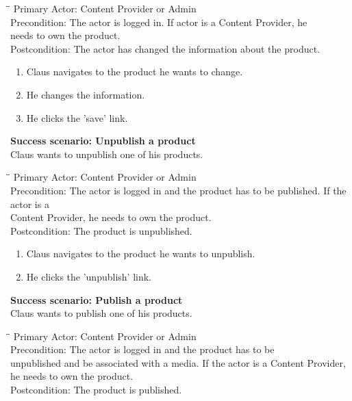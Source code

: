 \begin{tabbing}
\hspace{5mm}\=\hspace{26mm}\=\kill
\>Primary Actor:\> Content Provider or Admin\\
\>Precondition:\> The actor is logged in. If actor is a Content Provider, he\\ \hspace{85px} needs to own the product.\\
\>Postcondition:\> The actor has changed the information about the product.
\end{tabbing}
\begin{enumerate} \setlength{\itemsep}{-1mm}
	\item Claus navigates to the product he wants to change.
	\item He changes the information.
	\item He clicks the 'save' link.
\end{enumerate}
\vspace{3mm}
\textbf{Success scenario: Unpublish a product} \\
Claus wants to unpublish one of his products.
\begin{tabbing}
\hspace{5mm}\=\hspace{26mm}\=\kill
\>Primary Actor:\> Content Provider or Admin\\
\>Precondition:\> The actor is logged in and the product has to be published. If the actor is a\\ \hspace{85px} Content Provider, he needs to own the product.\\
\>Postcondition:\> The product is unpublished.
\end{tabbing}
\begin{enumerate} \setlength{\itemsep}{-1mm}
	\item Claus navigates to the product he wants to unpublish.
	\item He clicks the 'unpublish' link.
\end{enumerate}
\vspace{3mm}
\textbf{Success scenario: Publish a product} \\
Claus wants to publish one of his products.
\begin{tabbing}
\hspace{5mm}\=\hspace{26mm}\=\kill
\>Primary Actor:\> Content Provider or Admin\\
\>Precondition:\> The actor is logged in and the product has to be\\ \hspace{85px} unpublished and be associated with a media. If the actor is a Content Provider, he needs to own the product.\\
\>Postcondition:\> The product is published.
\end{tabbing}
